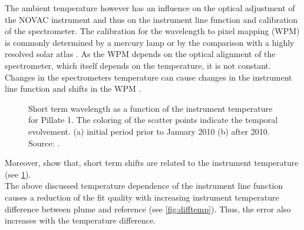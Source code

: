 The ambient temperature however has an influence on the optical adjustment of the NOVAC instrument and thus on the instrument line function and calibration of the spectrometer.
The calibration for the wavelength to pixel mapping (WPM) is commonly determined by a mercury lamp or by the comparison with a highly resolved solar atlas \cite{chance2010improved}.
As the WPM depends on the optical alignment of the spectrometer, which itself depends on the temperature, it is not constant.
Changes in the spectrometers temperature can cause changes in the instrument line function and shifts in the WPM \citep{pinardi2007influence}. 
\begin{figure}		
	\caption{Short term wavelength as a function of the instrument temperature for Pillate 1. The coloring of the scatter points indicate the temporal evolvement. (a) initial period prior to January 2010 (b) after 2010. Source: \cite{WarnachSimon}.}
	\label{fig:shorttermshift}
\end{figure}
Moreover, \cite{WarnachSimon} show that, short term shifts are related to the instrument temperature (see \cref{fig:shorttermshift}).\\
The above discussed temperature dependence of the instrument line function causes a reduction of the fit quality with increasing instrument temperature difference between plume and reference (see \cref{fig:difftemp}). Thus, the  error also increases with the temperature difference.
